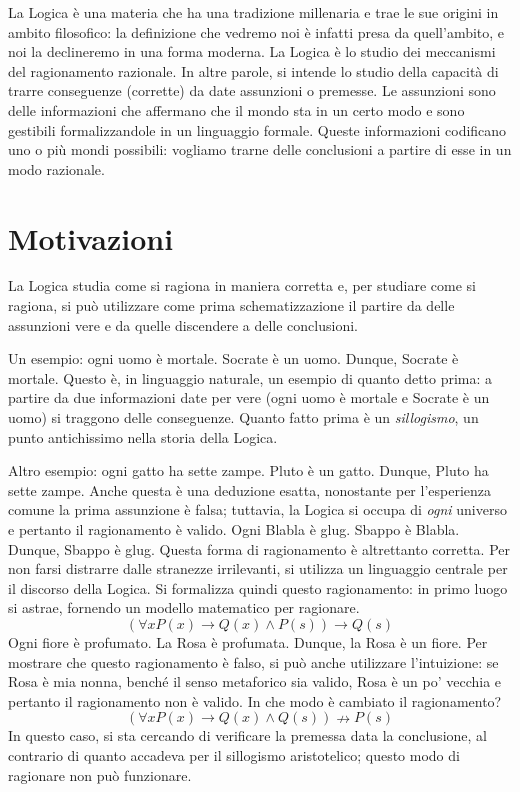 La Logica è una materia che ha una tradizione millenaria e trae le sue 
origini in ambito filosofico: la definizione che vedremo noi è infatti 
presa da quell'ambito, e noi la declineremo in una forma moderna. 
La Logica è lo studio dei meccanismi del ragionamento razionale. 
In altre parole, si intende lo studio della capacità di trarre conseguenze 
(corrette) da date assunzioni o premesse. Le assunzioni sono delle informazioni 
che affermano che il mondo sta in un certo modo e sono gestibili formalizzandole 
in un linguaggio formale. Queste informazioni codificano uno o più mondi possibili: 
vogliamo trarne delle conclusioni a partire di esse in un modo razionale. 

\section{Motivazioni}
La Logica studia come si ragiona in maniera corretta e, per studiare come 
si ragiona, si può utilizzare come prima schematizzazione il partire da delle 
assunzioni vere e da quelle discendere a delle conclusioni.

Un esempio: ogni uomo è mortale. Socrate è un uomo. 
Dunque, Socrate è mortale. Questo è, in linguaggio naturale, un esempio di quanto 
detto prima: a partire da due informazioni date per vere (ogni uomo è mortale e 
Socrate è un uomo) si traggono delle conseguenze. Quanto fatto prima è un 
\textit{sillogismo}, un punto antichissimo nella storia della Logica.

Altro esempio: ogni gatto ha sette zampe. Pluto è un gatto. Dunque, Pluto 
ha sette zampe. Anche questa è una deduzione esatta, nonostante per l'esperienza 
comune la prima assunzione è falsa; tuttavia, la Logica si occupa di \textit{ogni}
universo e pertanto il ragionamento è valido. 
Ogni Blabla è glug. Sbappo è Blabla. Dunque, Sbappo è glug. Questa forma di 
ragionamento è altrettanto corretta. 
Per non farsi distrarre dalle stranezze irrilevanti, si utilizza un linguaggio 
centrale per il discorso della Logica. Si formalizza quindi questo ragionamento: 
in primo luogo si astrae, fornendo un modello matematico per ragionare.
$$
(\forall x P(x) \rightarrow Q(x) \land P(s)) \rightarrow Q(s)
$$
Ogni fiore è profumato. La Rosa è profumata. Dunque, la Rosa è un fiore. 
Per mostrare che questo ragionamento è falso, si può anche utilizzare l'intuizione: 
se Rosa è mia nonna, benché il senso metaforico sia valido, Rosa è un po' vecchia 
e pertanto il ragionamento non è valido. In che modo è cambiato il ragionamento? 
$$
(\forall x P(x) \rightarrow Q(x) \land Q(s)) \nrightarrow P(s)
$$
In questo caso, si sta cercando di verificare la premessa data la conclusione, 
al contrario di quanto accadeva per il sillogismo aristotelico; questo modo 
di ragionare non può funzionare. 

